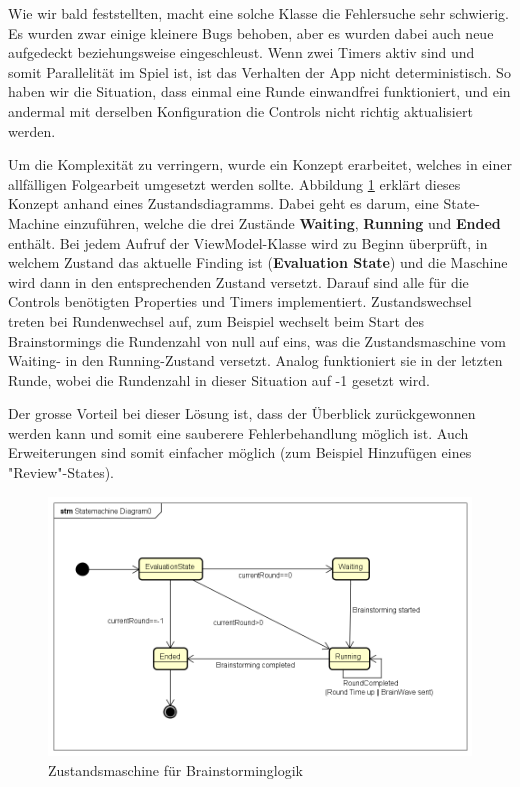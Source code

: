 Wie wir bald feststellten, macht eine solche Klasse die Fehlersuche sehr schwierig. Es wurden zwar einige kleinere Bugs behoben, aber es wurden dabei auch neue aufgedeckt beziehungsweise eingeschleust. Wenn zwei Timers aktiv sind und somit Parallelität im Spiel ist, ist das Verhalten der App nicht deterministisch. So haben wir die Situation, dass einmal eine Runde einwandfrei funktioniert, und ein andermal mit derselben Konfiguration die Controls nicht richtig aktualisiert werden. 

Um die Komplexität zu verringern, wurde ein Konzept erarbeitet, welches in einer allfälligen Folgearbeit umgesetzt werden sollte. Abbildung \ref{fig:statemachine-brainstorming} erklärt dieses Konzept anhand eines Zustandsdiagramms. Dabei geht es darum, eine State-Machine einzuführen, welche die drei Zustände \textbf{Waiting}, \textbf{Running} und \textbf{Ended} enthält. Bei jedem Aufruf der ViewModel-Klasse wird zu Beginn überprüft, in welchem Zustand das aktuelle Finding ist (\textbf{Evaluation State}) und die Maschine wird dann in den entsprechenden Zustand versetzt. Darauf sind alle für die Controls benötigten Properties und Timers implementiert. Zustandswechsel treten bei Rundenwechsel auf, zum Beispiel wechselt beim Start des Brainstormings die Rundenzahl von null auf eins, was die Zustandsmaschine vom Waiting- in den Running-Zustand versetzt. Analog funktioniert sie in der letzten Runde, wobei die Rundenzahl in dieser Situation auf -1 gesetzt wird. 

Der grosse Vorteil bei dieser Lösung ist, dass der Überblick zurückgewonnen werden kann und somit eine sauberere Fehlerbehandlung möglich ist. Auch Erweiterungen sind somit einfacher möglich (zum Beispiel Hinzufügen eines "Review"-States). 
\begin{figure}
	\centering
	\includegraphics[width=0.7\linewidth]{img/techn-bericht/statemachine-brainstorming}
	\caption{Zustandsmaschine für Brainstorminglogik}
	\label{fig:statemachine-brainstorming}
\end{figure}

